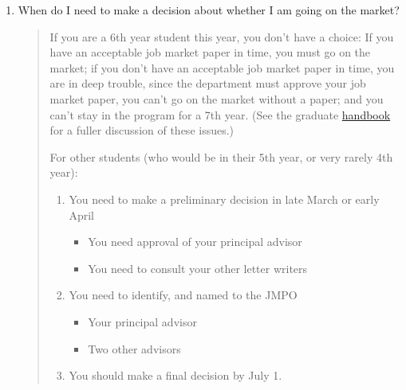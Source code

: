 \documentclass{\classes/econtex}
\providecommand\phantomsection{}
\begin{document}
\begin{enumerate}
\begin{quote}
    \ifdvi\phantomsection\hypertarget{DecideByWhen}{}\fi
    
  \end{quote}

\item  When do I need to make a decision about whether I am going on
  the market?

  \begin{quote}
    If you are a 6th year student this year, you don't have a choice: If
    you have an acceptable job market paper in time, you must go on the
    market; if you don't have an acceptable job market paper in time, you
    are in deep trouble, since the department must approve your job market
    paper, you can't go on the market without a paper; and you can't stay
    in the program for a 7th year.  (See the graduate \href{https://www.econ2.jhu.edu/pdf/GraduateStudentHandbook_2023-2024.pdf}{handbook} for a fuller discussion of these issues.) 

    For other students (who would be in their 5th year, or very rarely 4th year):

    \begin{enumerate}
    \item You need to make a preliminary decision in late March or early April
      \begin{itemize}
      \item You need approval of your principal advisor
      \item You need to consult your other letter writers
      \end{itemize}
    \item You need to identify, and named to the JMPO
      \begin{itemize}
      \item Your principal advisor
      \item Two other advisors
      \end{itemize}
    \item You should make a final decision by July 1.  
    \end{enumerate}
    
    \begin{comment}

      In the dept meeting on 2006-10-17 a question was raised about
      whether we are really serious about our policy, as stated by Larry,
      that ``there is no such thing as a 7th year student.''  

      The answer is yes.


\end{comment}
\end{quote}
\end{enumerate}
\end{document}
